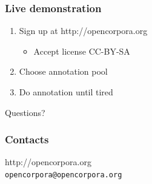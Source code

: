 \documentclass{beamer}
\begin{document}
\begin{frame}
\frametitle{Live demonstration}
\begin{enumerate}
\item{Sign up at http://opencorpora.org}
    \begin{itemize}
    \item{Accept license CC-BY-SA}
    \end{itemize}
\item{Choose annotation pool}
\item{Do annotation until tired}
\end{enumerate}
\end{frame}

\begin{frame}
Questions?
\end{frame}

\begin{frame}
\frametitle{Contacts}
\begin{center}
\LARGE http://opencorpora.org\\[\bigskipamount]
\Large\texttt{opencorpora@opencorpora.org}
\end{center}
\end{frame}
\end{document}
